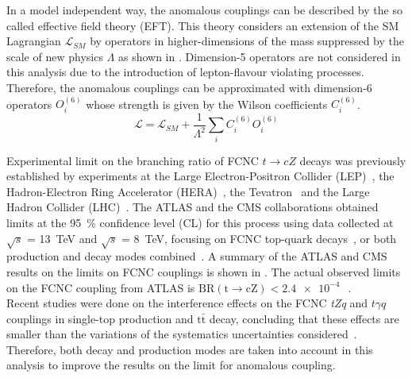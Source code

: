 \noindent In a model independent way, the anomalous couplings can be described by the so called effective field theory (EFT).
This theory considers an extension of the SM Lagrangian $\mathcal{L}_{SM}$ by operators in higher-dimensions of the mass suppressed by the scale of new physics $\Lambda$ as shown in .
Dimension-5 operators are not considered in this analysis due to the introduction of lepton-flavour violating processes. 
Therefore, the anomalous couplings can be approximated with dimension-6 operators $O_{i}^{(6)}$ whose strength  is given by the Wilson coefficients $C_{i}^{(6)}$.\\

\begin{equation}
\mathcal{L} = \mathcal{L}_{SM} + \frac{1}{\Lambda^2}\sum_{i} C_{i}^{(6)} O_{i}^{(6)}  
\label{eq:lagrangian}
\end{equation}

\noindent Experimental limit on the branching ratio of FCNC $t\rightarrow cZ$ decays was previously established by experiments at the Large Electron-Positron Collider (LEP)~\cite{ALEPH,DELPHI,OPAL,L3}, the Hadron-Electron Ring Accelerator (HERA)~\cite{ZEUS}, the Tevatron\ \cite{CDF,DZero} and the Large Hadron Collider (LHC)~\cite{TOPQ-2017-06,Chatrchyan:2013nwa,CMS-TOP-12-039}. The ATLAS and the CMS collaborations obtained limits at the \SI{95}{\percent} confidence level (CL) for this process using data collected at $\sqrt{s}$ = \SI{13}{\TeV} and $\sqrt{s}$ = \SI{8}{\TeV}, focusing on FCNC top-quark decays~\cite{TOPQ-2017-06,Chatrchyan:2013nwa}, or both production and decay modes combined~\cite{CMS-TOP-12-039}. 
A summary of the ATLAS and CMS results on the limits on FCNC couplings is shown in . The actual observed limits on the FCNC \tZc coupling from ATLAS is $\mathrm{BR(t\to cZ) < \SI{2.4e-4}{}}$~\cite{TOPQ-2017-06}.\\
Recent studies were done on the interference effects on the FCNC \textit{tZq} and $t\gamma q$ couplings in single-top production and $\mathrm{t\bar{t}}$ decay, concluding that these effects are smaller than the variations of the systematics uncertainties considered~\cite{Interference}. Therefore, both decay and production modes are taken into account in this analysis to improve the results on the limit for \tZc anomalous coupling.

